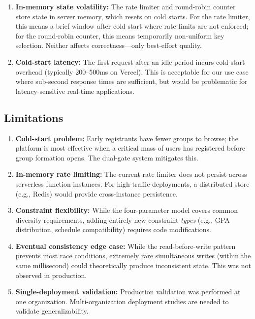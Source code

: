 \documentclass[11pt,a4paper]{article}
\theoremstyle{plain}
\theoremstyle{definition}
\begin{document}
\begin{enumerate}[noitemsep,topsep=4pt]
    \item \textbf{In-memory state volatility:} The rate limiter and round-robin counter store state in server memory, which resets on cold starts. For the rate limiter, this means a brief window after cold start where rate limits are not enforced; for the round-robin counter, this means temporarily non-uniform key selection. Neither affects correctness---only best-effort quality.

    \item \textbf{Cold-start latency:} The first request after an idle period incurs cold-start overhead (typically 200--500ms on Vercel). This is acceptable for our use case where sub-second response times are sufficient, but would be problematic for latency-sensitive real-time applications.
\end{enumerate}

\subsection{Limitations}

\begin{enumerate}[noitemsep,topsep=4pt]
    \item \textbf{Cold-start problem:} Early registrants have fewer groups to browse; the platform is most effective when a critical mass of users has registered before group formation opens. The dual-gate system mitigates this.

    \item \textbf{In-memory rate limiting:} The current rate limiter does not persist across serverless function instances. For high-traffic deployments, a distributed store (e.g., Redis) would provide cross-instance persistence.

    \item \textbf{Constraint flexibility:} While the four-parameter model covers common diversity requirements, adding entirely new constraint \emph{types} (e.g., GPA distribution, schedule compatibility) requires code modifications.

    \item \textbf{Eventual consistency edge case:} While the read-before-write pattern prevents most race conditions, extremely rare simultaneous writes (within the same millisecond) could theoretically produce inconsistent state. This was not observed in production.

    \item \textbf{Single-deployment validation:} Production validation was performed at one organization. Multi-organization deployment studies are needed to validate generalizability.
\end{enumerate}
\end{document}
